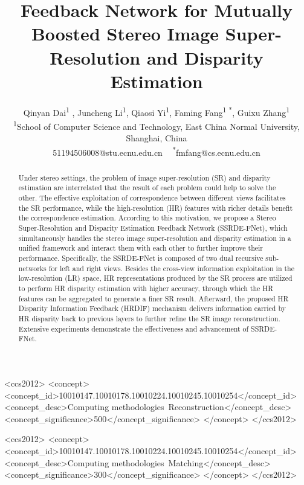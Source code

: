 \documentclass[sigconf]{acmart}
\author{Qinyan Dai\textsuperscript{1 }, Juncheng Li\textsuperscript{1}, Qiaosi Yi\textsuperscript{1}, Faming Fang\textsuperscript{1 *}, Guixu Zhang\textsuperscript{1}\\ \small \textsuperscript{1}School of Computer Science and Technology, East China Normal University, Shanghai, China\\ \small \textsuperscript{}51194506008@stu.ecnu.edu.cn \,\,\,  \textsuperscript{*}fmfang@cs.ecnu.edu.cn}
\begin{document}
\title{Feedback Network for Mutually Boosted Stereo Image Super-Resolution and Disparity Estimation}

\begin{abstract}
Under stereo settings, the problem of image super-resolution (SR) and disparity estimation are interrelated that the result of each problem could help to solve the other. The effective exploitation of correspondence between different views facilitates the SR performance, while the high-resolution (HR) features with richer details benefit the correspondence estimation. According to this motivation, we propose a Stereo Super-Resolution and Disparity Estimation Feedback Network (SSRDE-FNet), which simultaneously handles the stereo image super-resolution and disparity estimation in a unified framework and interact them with each other to further improve their performance. Specifically, the SSRDE-FNet is composed of two dual recursive sub-networks for left and right views. Besides the cross-view information exploitation in the low-resolution (LR) space, HR representations produced by the SR process are utilized to perform HR disparity estimation with higher accuracy, through which the HR features can be aggregated to generate a finer SR result. Afterward, the proposed HR Disparity Information Feedback (HRDIF) mechanism delivers information carried by HR disparity back to previous layers to further refine the SR image reconstruction. Extensive experiments demonstrate the effectiveness and advancement of SSRDE-FNet.
\end{abstract}

\begin{CCSXML}
<ccs2012>
<concept>
<concept_id>10010147.10010178.10010224.10010245.10010254</concept_id>
<concept_desc>Computing methodologies~Reconstruction</concept_desc>
<concept_significance>500</concept_significance>
</concept>
</ccs2012>

<ccs2012>
<concept>
<concept_id>10010147.10010178.10010224.10010245.10010254</concept_id>
<concept_desc>Computing methodologies~Matching</concept_desc>
<concept_significance>300</concept_significance>
</concept>
</ccs2012>

\end{CCSXML}




\maketitle
\end{document}
